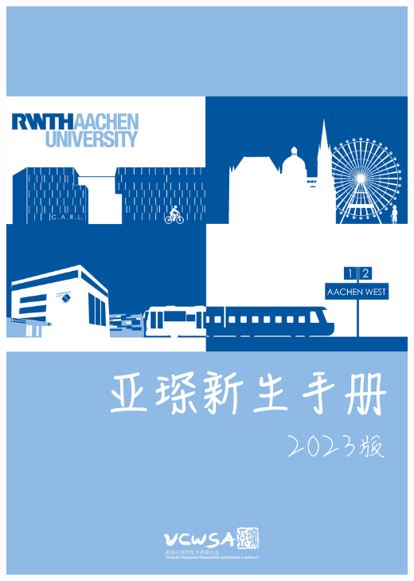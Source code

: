 \documentclass[a4paper,10pt,oneside]{scrbook}
\begin{document}
\frontmatter

\begin{titlepage}
\parindent=0pt
\includegraphics[width=\linewidth]{Bilder/FrontCover.jpg}
\end{titlepage}



\tableofcontents

\mainmatter








\end{document}
